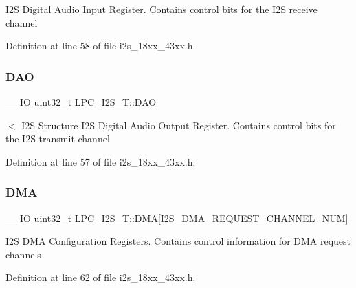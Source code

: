 I2S Digital Audio Input Register. Contains control bits for the I2S receive channel 

Definition at line 58 of file i2s\+\_\+18xx\+\_\+43xx.\+h.

\mbox{\label{struct_l_p_c___i2_s___t_ad574a0e2f1cdec634e05ee8176c0450e}} 
\subsubsection{\texorpdfstring{D\+AO}{DAO}}
{\footnotesize\ttfamily \hyperlink{core__sc300_8h_aec43007d9998a0a0e01faede4133d6be}{\+\_\+\+\_\+\+IO} uint32\+\_\+t L\+P\+C\+\_\+\+I2\+S\+\_\+\+T\+::\+D\+AO}

$<$ I2S Structure I2S Digital Audio Output Register. Contains control bits for the I2S transmit channel 

Definition at line 57 of file i2s\+\_\+18xx\+\_\+43xx.\+h.

\mbox{\label{struct_l_p_c___i2_s___t_a2259283a5ad23aa09617861948df25d7}} 
\subsubsection{\texorpdfstring{D\+MA}{DMA}}
{\footnotesize\ttfamily \hyperlink{core__sc300_8h_aec43007d9998a0a0e01faede4133d6be}{\+\_\+\+\_\+\+IO} uint32\+\_\+t L\+P\+C\+\_\+\+I2\+S\+\_\+\+T\+::\+D\+MA\mbox{[}\hyperlink{group___i2_s__18_x_x__43_x_x_ggac04c1583101ddd661886d9677683421bab9921186ab93fee889b2074d508b88ce}{I2\+S\+\_\+\+D\+M\+A\+\_\+\+R\+E\+Q\+U\+E\+S\+T\+\_\+\+C\+H\+A\+N\+N\+E\+L\+\_\+\+N\+UM}\mbox{]}}

I2S D\+MA Configuration Registers. Contains control information for D\+MA request channels 

Definition at line 62 of file i2s\+\_\+18xx\+\_\+43xx.\+h.

\mbox{\label{struct_l_p_c___i2_s___t_a0ed73323cb1c577293f1416c6c55c47f}} 
